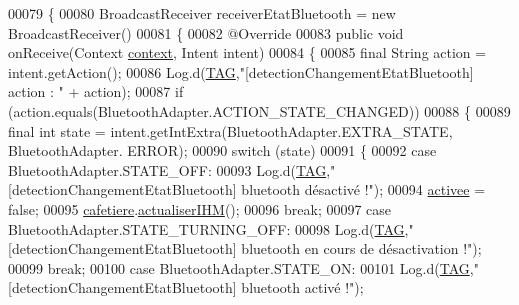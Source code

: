 \begin{DoxyCode}
00079     \{
00080         BroadcastReceiver receiverEtatBluetooth = \textcolor{keyword}{new} BroadcastReceiver()
00081         \{
00082             @Override
00083             \textcolor{keyword}{public} \textcolor{keywordtype}{void} onReceive(Context \hyperlink{classcom_1_1example_1_1ekawa_1_1_communication_aa5ae3c4eaab6ec31d3b358431e812d00}{context}, Intent intent)
00084             \{
00085                 \textcolor{keyword}{final} String action = intent.getAction();
00086                 Log.d(\hyperlink{classcom_1_1example_1_1ekawa_1_1_communication_af355bac38153a4e6d1cda0b3e74bc1c7}{TAG},\textcolor{stringliteral}{"[detectionChangementEtatBluetooth] action : "} + action);
00087                 \textcolor{keywordflow}{if} (action.equals(BluetoothAdapter.ACTION\_STATE\_CHANGED))
00088                 \{
00089                     \textcolor{keyword}{final} \textcolor{keywordtype}{int} state = intent.getIntExtra(BluetoothAdapter.EXTRA\_STATE, BluetoothAdapter.
      ERROR);
00090                     \textcolor{keywordflow}{switch} (state)
00091                     \{
00092                         \textcolor{keywordflow}{case} BluetoothAdapter.STATE\_OFF:
00093                             Log.d(\hyperlink{classcom_1_1example_1_1ekawa_1_1_communication_af355bac38153a4e6d1cda0b3e74bc1c7}{TAG},\textcolor{stringliteral}{"[detectionChangementEtatBluetooth] bluetooth désactivé !"});
00094                             \hyperlink{classcom_1_1example_1_1ekawa_1_1_communication_a2f49177a9865ed41a759bce83658bb6e}{activee} = \textcolor{keyword}{false};
00095                             \hyperlink{classcom_1_1example_1_1ekawa_1_1_communication_a3b69b78cdf60bc35b2e3e564519dc1b6}{cafetiere}.\hyperlink{classcom_1_1example_1_1ekawa_1_1_cafetiere_ad8c8b7d410315f55a216de809571fd87}{actualiserIHM}();
00096                             \textcolor{keywordflow}{break};
00097                         \textcolor{keywordflow}{case} BluetoothAdapter.STATE\_TURNING\_OFF:
00098                             Log.d(\hyperlink{classcom_1_1example_1_1ekawa_1_1_communication_af355bac38153a4e6d1cda0b3e74bc1c7}{TAG},\textcolor{stringliteral}{"[detectionChangementEtatBluetooth] bluetooth en cours de
       désactivation !"});
00099                             \textcolor{keywordflow}{break};
00100                         \textcolor{keywordflow}{case} BluetoothAdapter.STATE\_ON:
00101                             Log.d(\hyperlink{classcom_1_1example_1_1ekawa_1_1_communication_af355bac38153a4e6d1cda0b3e74bc1c7}{TAG},\textcolor{stringliteral}{"[detectionChangementEtatBluetooth] bluetooth activé !"});

\end{DoxyCode}
